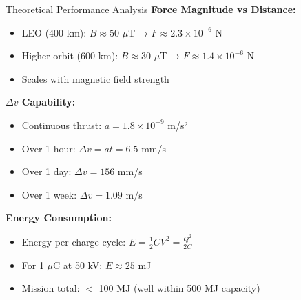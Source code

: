 \documentclass[aspectratio=169]{beamer}
\begin{document}
\begin{frame}{Theoretical Performance Analysis}
\textbf{Force Magnitude vs Distance:}
\begin{itemize}
    \item LEO (400 km): $B \approx 50$ $\mu$T → $F \approx 2.3 \times 10^{-6}$ N
    \item Higher orbit (600 km): $B \approx 30$ $\mu$T → $F \approx 1.4 \times 10^{-6}$ N
    \item Scales with magnetic field strength
\end{itemize}

\vspace{0.5em}
\textbf{$\Delta v$ Capability:}
\begin{itemize}
    \item Continuous thrust: $a = 1.8 \times 10^{-9}$ m/s²
    \item Over 1 hour: $\Delta v = at = 6.5$ mm/s
    \item Over 1 day: $\Delta v = 156$ mm/s
    \item Over 1 week: $\Delta v = 1.09$ m/s
\end{itemize}

\vspace{0.5em}
\textbf{Energy Consumption:}
\begin{itemize}
    \item Energy per charge cycle: $E = \frac{1}{2}CV^2 = \frac{Q^2}{2C}$
    \item For 1 $\mu$C at 50 kV: $E \approx 25$ mJ
    \item Mission total: $<$ 100 MJ (well within 500 MJ capacity)
\end{itemize}
\end{frame}
\end{document}
